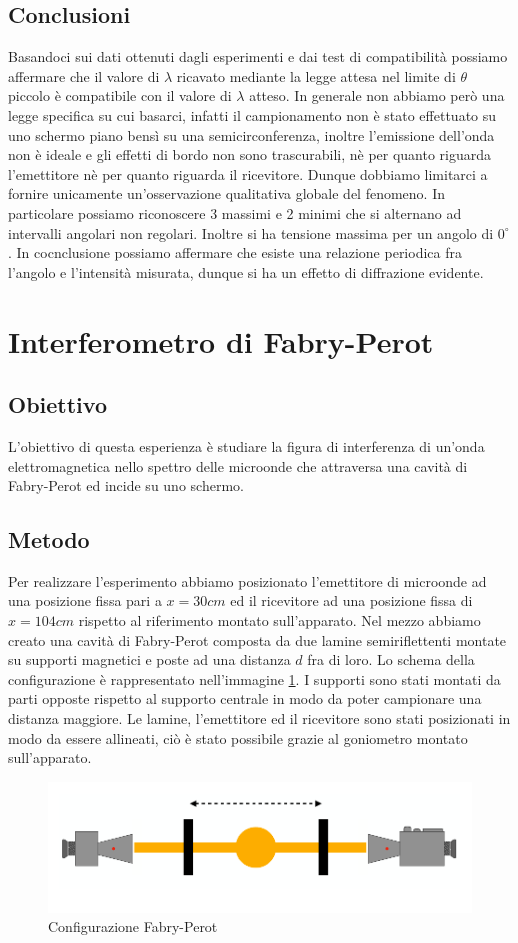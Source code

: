 \documentclass[a4paper]{article}
\begin{document}
\subsection{Conclusioni}
 Basandoci sui dati ottenuti dagli esperimenti e dai test di compatibilità possiamo affermare che il valore di $\lambda$ ricavato mediante la legge attesa nel limite di $\theta$ piccolo è compatibile con il valore di $\lambda$ atteso. In generale non abbiamo però una legge specifica su cui basarci, infatti il campionamento non è stato effettuato su uno schermo piano bensì su una semicirconferenza, inoltre l'emissione dell'onda non è ideale e gli effetti di bordo non sono trascurabili, nè per quanto riguarda l'emettitore nè per quanto riguarda il ricevitore. Dunque dobbiamo limitarci a fornire unicamente un'osservazione qualitativa globale del fenomeno. In particolare possiamo riconoscere 3 massimi e 2 minimi che si alternano ad intervalli angolari non regolari. Inoltre si ha tensione massima per un angolo di $0^\circ$. In cocnclusione possiamo affermare che esiste una relazione periodica fra l'angolo e l'intensità misurata, dunque si ha un effetto di diffrazione evidente.

\section{Interferometro di Fabry-Perot}
\subsection{Obiettivo}
L'obiettivo di questa esperienza è studiare la figura di interferenza di un'onda elettromagnetica nello spettro delle microonde che attraversa una cavità di Fabry-Perot ed incide su uno schermo.
\subsection{Metodo}
Per realizzare l'esperimento abbiamo posizionato l'emettitore di microonde ad una posizione fissa pari a $x=30cm$  ed il ricevitore ad una posizione fissa di $x=104cm$ rispetto al riferimento montato sull'apparato. Nel mezzo abbiamo creato una cavità di Fabry-Perot composta da due lamine semiriflettenti montate su supporti magnetici e poste ad una  distanza $d$ fra di loro. Lo schema della configurazione è rappresentato nell'immagine \ref{fig:Configurazione Fabry-Perot}. I supporti sono stati montati da parti opposte rispetto al supporto centrale in modo da poter campionare una distanza maggiore. Le lamine, l'emettitore ed il ricevitore sono stati posizionati in modo da essere allineati, ciò è stato possibile grazie al goniometro montato sull'apparato.
\begin{figure}[H]
    \centering
    \includegraphics[width=0.7\linewidth]{grafici/Fabry-Perot configurazione.png}
    \caption{Configurazione Fabry-Perot}
    \label{fig:Configurazione Fabry-Perot}
\end{figure}
\end{document}
